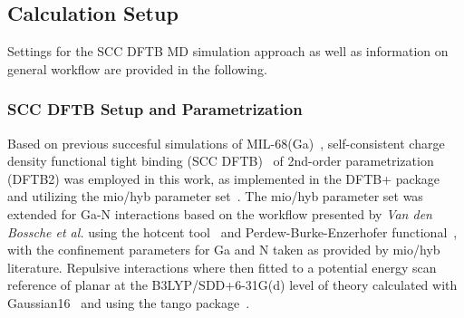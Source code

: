 \documentclass[11pt]{article}
\begin{document}
\subsection{Calculation Setup}
Settings for the SCC DFTB MD simulation approach as well as information on general workflow are provided in the following.

\subsubsection{SCC DFTB Setup and Parametrization}

Based on previous succesful simulations of MIL-68(Ga)~\cite{Fischereder2023,Purtscher2023,Hofer2023}, self-consistent charge density functional tight binding (SCC DFTB)~\cite{Oliveira2009} of 2nd-order parametrization (DFTB2) was employed in this work, as implemented in the DFTB+ package~\cite{Hourahine2020} and utilizing the mio/hyb parameter set~\cite{Elstner1998, Yang2008, Szcs2004,SzuxBcs2003}. The mio/hyb parameter set was extended for Ga-N interactions based on the workflow presented by \textit{Van den Bossche et al.} using the hotcent tool~\cite{VandenBossche2024,VandenBossche2019} and Perdew-Burke-Enzerhofer functional~\cite{Perdew1996}, with the confinement parameters for Ga and N taken as provided by mio/hyb literature. Repulsive interactions where then fitted to a potential energy scan reference of planar  at the B3LYP/SDD+6-31G(d) level of theory calculated with Gaussian16~\cite{Ditchfield1971-lb,Becke1993-qq,Hariharan1973-nu,Hehre1972-vi,Rassolov2001-or,Bergner1993-ua} and using the tango package~\cite{VandenBossche2018}.
\end{document}
